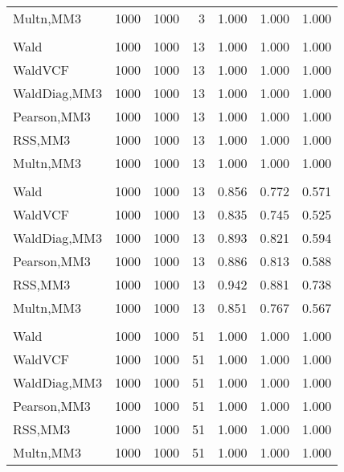 \documentclass[
]{article}
\begin{document}
\begin{table}[H]
{\begin{tabular}[t]{lrrrrrr}
\hspace{1em}Multn,MM3 & 1000 & 1000 & 3 & 1.000 & 1.000 & 1.000\\
\addlinespace[0.3em]
\multicolumn{7}{l}{\textbf{1F 15V}}\\
\hspace{1em}Wald & 1000 & 1000 & 13 & 1.000 & 1.000 & 1.000\\
\hspace{1em}WaldVCF & 1000 & 1000 & 13 & 1.000 & 1.000 & 1.000\\
\hspace{1em}WaldDiag,MM3 & 1000 & 1000 & 13 & 1.000 & 1.000 & 1.000\\
\hspace{1em}Pearson,MM3 & 1000 & 1000 & 13 & 1.000 & 1.000 & 1.000\\
\hspace{1em}RSS,MM3 & 1000 & 1000 & 13 & 1.000 & 1.000 & 1.000\\
\hspace{1em}Multn,MM3 & 1000 & 1000 & 13 & 1.000 & 1.000 & 1.000\\
\addlinespace[0.3em]
\multicolumn{7}{l}{\textbf{2F 10V}}\\
\hspace{1em}Wald & 1000 & 1000 & 13 & 0.856 & 0.772 & 0.571\\
\hspace{1em}WaldVCF & 1000 & 1000 & 13 & 0.835 & 0.745 & 0.525\\
\hspace{1em}WaldDiag,MM3 & 1000 & 1000 & 13 & 0.893 & 0.821 & 0.594\\
\hspace{1em}Pearson,MM3 & 1000 & 1000 & 13 & 0.886 & 0.813 & 0.588\\
\hspace{1em}RSS,MM3 & 1000 & 1000 & 13 & 0.942 & 0.881 & 0.738\\
\hspace{1em}Multn,MM3 & 1000 & 1000 & 13 & 0.851 & 0.767 & 0.567\\
\addlinespace[0.3em]
\multicolumn{7}{l}{\textbf{3F 15V}}\\
\hspace{1em}Wald & 1000 & 1000 & 51 & 1.000 & 1.000 & 1.000\\
\hspace{1em}WaldVCF & 1000 & 1000 & 51 & 1.000 & 1.000 & 1.000\\
\hspace{1em}WaldDiag,MM3 & 1000 & 1000 & 51 & 1.000 & 1.000 & 1.000\\
\hspace{1em}Pearson,MM3 & 1000 & 1000 & 51 & 1.000 & 1.000 & 1.000\\
\hspace{1em}RSS,MM3 & 1000 & 1000 & 51 & 1.000 & 1.000 & 1.000\\
\hspace{1em}Multn,MM3 & 1000 & 1000 & 51 & 1.000 & 1.000 & 1.000\\
\bottomrule
\end{tabular}}
\endgroup{}
\end{table}
\end{document}
